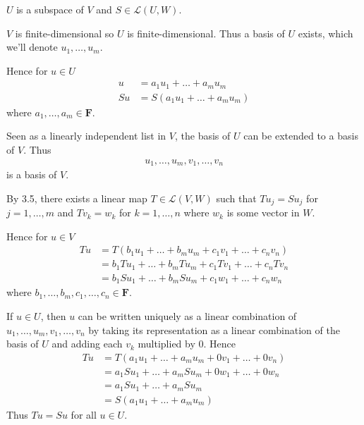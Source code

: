 \documentclass[a5paper]{article}
\begin{document}
\newcommand    \C  { \mathbf{C} }
\newcommand    \R  { \mathbf{R} }
\renewcommand  \L  { \mathcal{L} }
\newcommand    \F  { \mathbf{F} }

$U$ is a subspace of $V$ and $S \in \L(U,W)$.

$V$ is finite-dimensional so $U$ is finite-dimensional.
Thus a basis of $U$ exists, which we'll denote $u_1,\dots,u_m$.

Hence for $u \in U$
\begin{align*}
     u &= a_1u_1 + \dots + a_mu_m       \\
    Su &= S(a_1u_1 + \dots + a_mu_m)
\end{align*}
where $a_1,\dots,a_m \in \F$.

Seen as a linearly independent list in $V$, the basis of $U$ can be extended to a basis of $V$.
Thus
\begin{align*}
    u_1,\dots,u_m,v_1,\dots,v_n
\end{align*}
is a basis of $V$.

By 3.5, there exists a linear map $T \in \L(V,W)$ such that $Tu_j=Su_j$ for $j=1,\dots,m$ and $Tv_k=w_k$ for $k=1,\dots,n$ where $w_k$ is some vector in $W$.

Hence for $u\in V$
\begin{align*}
    Tu  &= T(b_1u_1 + \dots + b_mu_m + c_1v_1 + \dots + c_nv_n)     \\
        &= b_1Tu_1 + \dots + b_mTu_m + c_1Tv_1 + \dots + c_nTv_n    \\
        &= b_1Su_1 + \dots + b_mSu_m + c_1w_1 + \dots + c_nw_n
\end{align*}
where $b_1,\dots,b_m,c_1,\dots,c_n\in\F$.

If $u \in U$, then $u$ can be written uniquely as a linear combination of $u_1,\dots,u_m,v_1,\dots,v_n$ by taking its representation as a linear combination of the basis of $U$ and adding each $v_k$ multiplied by 0.
Hence
\begin{align*}
    Tu  &= T(a_1u_1 + \dots + a_mu_m + 0v_1 + \dots + 0v_n)     \\
        &= a_1Su_1 + \dots + a_mSu_m + 0w_1 + \dots + 0w_n      \\
        &= a_1Su_1 + \dots + a_mSu_m                            \\
        &= S(a_1u_1 + \dots + a_mu_m)
\end{align*}
Thus $Tu=Su$ for all $u\in U$.
\end{document}

